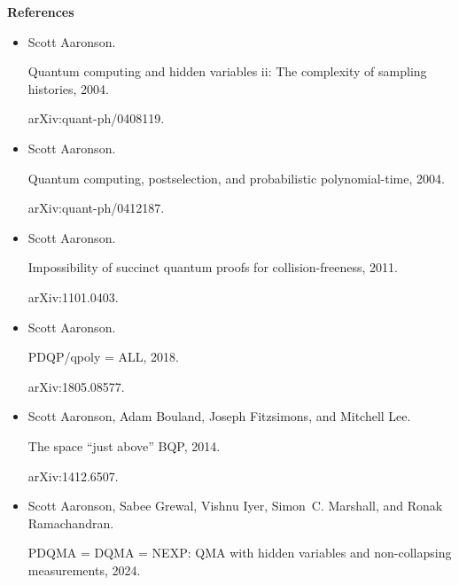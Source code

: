 \par\medskip\noindent\textbf{References}\par



\begin{itemize}


\item[] 
[1]

Scott Aaronson.


Quantum computing and hidden variables ii: The complexity of sampling
histories, 2004.


arXiv:quant-ph/0408119.





\item[] 
[2]

Scott Aaronson.


Quantum computing, postselection, and probabilistic polynomial-time,
2004.


arXiv:quant-ph/0412187.





\item[] 
[3]

Scott Aaronson.


Impossibility of succinct quantum proofs for collision-freeness,
2011.


arXiv:1101.0403.





\item[] 
[4]

Scott Aaronson.


PDQP/qpoly = ALL, 2018.


arXiv:1805.08577.





\item[] 
[5]

Scott Aaronson, Adam Bouland, Joseph Fitzsimons, and Mitchell Lee.


The space “just above” BQP, 2014.


arXiv:1412.6507.





\item[] 
[6]

Scott Aaronson, Sabee Grewal, Vishnu Iyer, Simon C. Marshall, and Ronak
Ramachandran.


PDQMA = DQMA = NEXP: QMA with hidden variables and non-collapsing
measurements, 2024.



\end{itemize}
